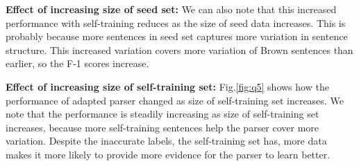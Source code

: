 \documentclass{article}
\begin{document}
\textbf{Effect of increasing size of seed set:} We can also note that this increased performance with self-training reduces as the size of seed data increases. This is probably because more sentences in seed set captures more variation in sentence structure. This increased variation covers more variation of Brown sentences than earlier, so the F-1 scores increase.

\textbf{Effect of increasing size of self-training set:} 
Fig.\ref{fig:q5} shows how the performance of adapted parser changed as size of self-training set increases. We note that the performance is steadily increasing as size of self-training set increases, because more self-training sentences help the parser cover more variation. Despite the inaccurate labels, the self-training set has, more data makes it more likely to provide more evidence for the parser to learn better. 
\end{document}
